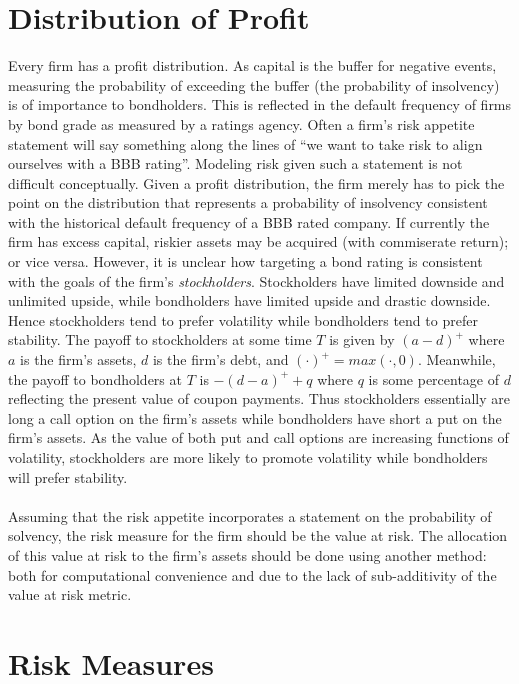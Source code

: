 \documentclass[12pt]{article}
\theoremstyle{definition}
\begin{document}
\section{Distribution of Profit}

Every firm has a profit distribution.  As capital is the buffer for negative events, measuring the probability of exceeding the buffer (the probability of insolvency) is of importance to bondholders.  This is reflected in the default frequency of firms by bond grade as measured by a ratings agency.  Often a firm's risk appetite statement will say something along the lines of ``we want to take risk to align ourselves with a BBB rating''.  Modeling risk given such a statement is not difficult conceptually.  Given a profit distribution, the firm merely has to pick the point on the distribution that represents a probability of insolvency consistent with the historical default frequency of a BBB rated company.  If currently the firm has excess capital, riskier assets may be acquired (with commiserate return); or vice versa.  However, it is unclear how targeting a bond rating is consistent with the goals of the firm's \emph{stockholders}.  Stockholders have limited downside and unlimited upside, while bondholders have limited upside and drastic downside.  Hence stockholders tend to prefer volatility while bondholders tend to prefer stability.   The payoff to stockholders at some time \(T\) is given by \((a-d)^+\) where \(a\) is the firm's assets, \(d\) is the firm's debt, and \((\cdot)^+=max(\cdot, 0)\).  Meanwhile, the payoff to bondholders at \(T\) is \(-(d-a)^+ +q\) where \(q\) is some percentage of \(d\) reflecting the present value of coupon payments.  Thus stockholders essentially are long a call option on the firm's assets while bondholders have short a put on the firm's assets.  As the value of both put and call options are increasing functions of volatility, stockholders are more likely to promote volatility while bondholders will prefer stability.  
\\
\\
Assuming that the risk appetite incorporates a statement on the probability of solvency, the risk measure for the firm should be the value at risk.  The allocation of this value at risk to the firm's assets should be done using another method: both for computational convenience and due to the lack of sub-additivity of the value at risk metric.  


\section{Risk Measures}
\end{document}
